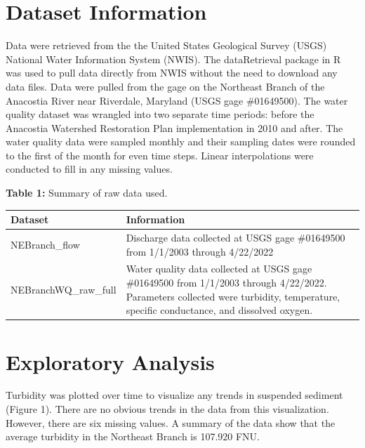 \documentclass[
  12pt,
]{article}
\begin{document}
\newpage

\hypertarget{dataset-information}{%
\section{Dataset Information}\label{dataset-information}}

Data were retrieved from the the United States Geological Survey (USGS)
National Water Information System (NWIS). The dataRetrieval package in R
was used to pull data directly from NWIS without the need to download
any data files. Data were pulled from the gage on the Northeast Branch
of the Anacostia River near Riverdale, Maryland (USGS gage \#01649500).
The water quality dataset was wrangled into two separate time periods:
before the Anacostia Watershed Restoration Plan implementation in 2010
and after. The water quality data were sampled monthly and their
sampling dates were rounded to the first of the month for even time
steps. Linear interpolations were conducted to fill in any missing
values.

\textbf{Table 1:} Summary of raw data used.

\begin{longtable}[]{@{}
  >{\raggedright\arraybackslash}p{}
  >{\raggedright\arraybackslash}p{}@{}}
\toprule
Dataset & Information \\
\midrule
\endhead
NEBranch\_flow & Discharge data collected at USGS gage \#01649500 from
1/1/2003 through 4/22/2022 \\
NEBranchWQ\_raw\_full & Water quality data collected at USGS gage
\#01649500 from 1/1/2003 through 4/22/2022. Parameters collected were
turbidity, temperature, specific conductance, and dissolved oxygen. \\
\bottomrule
\end{longtable}

\newpage

\hypertarget{exploratory-analysis}{%
\section{Exploratory Analysis}\label{exploratory-analysis}}

Turbidity was plotted over time to visualize any trends in suspended
sediment (Figure 1). There are no obvious trends in the data from this
visualization. However, there are six missing values. A summary of the
data show that the average turbidity in the Northeast Branch is 107.920
FNU.
\end{document}
